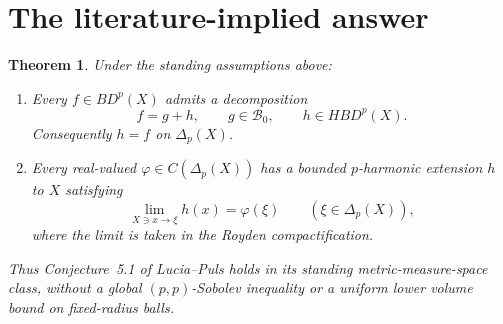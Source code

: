 \documentclass[11pt]{article}
\newtheorem{theorem}{Theorem}
\newcommand{\BD}{BD^p(X)}
\newcommand{\HBD}{HBD^p(X)}
\newcommand{\DeltaP}{\Delta_p(X)}
\begin{document}
\section{The literature-implied answer}

\begin{theorem}\label{thm:main}
Under the standing assumptions above:
\begin{enumerate}
\item Every $f\in\BD$ admits a decomposition
\[
 f=g+h,
 \qquad g\in\mathcal B_0,
 \qquad h\in\HBD.
\]
Consequently $h=f$ on $\DeltaP$.
\item Every real-valued $\varphi\in C(\DeltaP)$ has a bounded $p$-harmonic
extension $h$ to $X$ satisfying
\[
 \lim_{X\ni x\to\xi}h(x)=\varphi(\xi)
 \qquad(\xi\in\DeltaP),
\]
where the limit is taken in the Royden compactification.
\end{enumerate}
Thus Conjecture~5.1 of Lucia--Puls holds in its standing metric-measure-space
class, without a global $(p,p)$-Sobolev inequality or a uniform lower volume
bound on fixed-radius balls.
\end{theorem}
\end{document}
